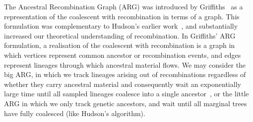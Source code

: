 \documentclass{article}
\begin{document}
The Ancestral Recombination Graph (ARG) was introduced by
Griffiths~\citep{griffiths1991two,griffiths1997ancestral}
as a representation of the coalescent with recombination in terms of a graph.
This formulation was complementary to Hudson's earlier
work~\citep{hudson1983properties}, and substantially increased our theoretical
understanding of recombination. In Griffiths' ARG formulation,
a realisation of the coalescent with recombination is a graph in which
vertices represent common ancestor or recombination events, and edges represent
lineages through which ancestral material flows.
We may consider the big ARG, in which we track lineages arising out of
recombinations regardless of whether they carry ancestral material and
consequently wait an exponentially large time until all sampled lineages
coalesce into a single ancestor~\citep{ethier1990two}, or the little ARG in
which we only track genetic ancestors, and wait until all marginal trees
have fully coalesced (like Hudson's algorithm).
\end{document}
